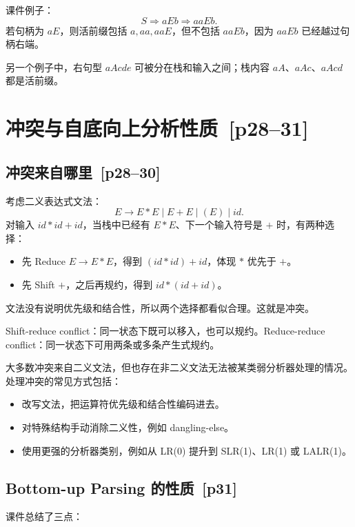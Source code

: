 \documentclass[UTF8,fontset=none,11pt]{ctexart}
\newenvironment{defbox}[1][]{%
  \par\medskip\noindent{\color{defrule}\rule{\linewidth}{1.1pt}}\par\nopagebreak
  \noindent{\bfseries\color{defrule}#1}\par\nopagebreak\smallskip}%
  {\par\nopagebreak\smallskip\noindent{\color{defrule}\rule{\linewidth}{0.4pt}}\par\medskip}
\newcommand{\pg}[1]{\texorpdfstring{{\small\color{graytext}\,[p#1]}}{ [p#1]}}
\begin{document}
课件例子：
\[
S\Rightarrow aEb\Rightarrow aaEb.
\]
若句柄为 \(aE\)，则活前缀包括 \(a, aa, aaE\)，但不包括 \(aaEb\)，因为 \(aaEb\) 已经越过句柄右端。

另一个例子中，右句型 \(aAcde\) 可被分在栈和输入之间；栈内容 \(aA\)、\(aAc\)、\(aAcd\) 都是活前缀。

\section{冲突与自底向上分析性质 \pg{28--31}}

\subsection{冲突来自哪里 \pg{28--30}}

考虑二义表达式文法：
\[
E\to E*E\mid E+E\mid (E)\mid id.
\]
对输入 \(id*id+id\)，当栈中已经有 \(E*E\)、下一个输入符号是 \(+\) 时，有两种选择：

\begin{itemize}
  \item 先 Reduce \(E\to E*E\)，得到 \((id*id)+id\)，体现 \(*\) 优先于 \(+\)。
  \item 先 Shift \(+\)，之后再规约，得到 \(id*(id+id)\)。
\end{itemize}

文法没有说明优先级和结合性，所以两个选择都看似合理。这就是冲突。

\begin{defbox}[两类冲突]
Shift-reduce conflict：同一状态下既可以移入，也可以规约。Reduce-reduce conflict：同一状态下可用两条或多条产生式规约。
\end{defbox}

大多数冲突来自二义文法，但也存在非二义文法无法被某类弱分析器处理的情况。处理冲突的常见方式包括：

\begin{itemize}
  \item 改写文法，把运算符优先级和结合性编码进去。
  \item 对特殊结构手动消除二义性，例如 dangling-else。
  \item 使用更强的分析器类别，例如从 LR(0) 提升到 SLR(1)、LR(1) 或 LALR(1)。
\end{itemize}

\subsection{Bottom-up Parsing 的性质 \pg{31}}

课件总结了三点：
\end{document}

